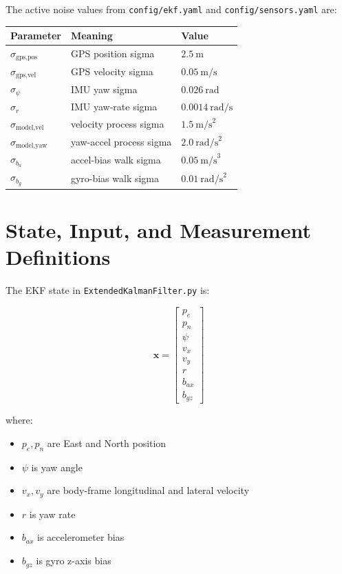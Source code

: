 \documentclass[11pt]{article}
\newcommand{\vect}[1]{\boldsymbol{#1}}
\begin{document}
The active noise values from \texttt{config/ekf.yaml} and \texttt{config/sensors.yaml} are:

\begin{center}
\begin{tabular}{lll}
\toprule
Parameter & Meaning & Value \\
\midrule
$\sigma_{\text{gps,pos}}$ & GPS position sigma & $2.5~\text{m}$ \\
$\sigma_{\text{gps,vel}}$ & GPS velocity sigma & $0.05~\text{m/s}$ \\
$\sigma_{\psi}$ & IMU yaw sigma & $0.026~\text{rad}$ \\
$\sigma_r$ & IMU yaw-rate sigma & $0.0014~\text{rad/s}$ \\
$\sigma_{\text{model,vel}}$ & velocity process sigma & $1.5~\text{m/s}^2$ \\
$\sigma_{\text{model,yaw}}$ & yaw-accel process sigma & $2.0~\text{rad/s}^2$ \\
$\sigma_{b_a}$ & accel-bias walk sigma & $0.05~\text{m/s}^3$ \\
$\sigma_{b_g}$ & gyro-bias walk sigma & $0.01~\text{rad/s}^2$ \\
\bottomrule
\end{tabular}
\end{center}

\section{State, Input, and Measurement Definitions}

The EKF state in \texttt{ExtendedKalmanFilter.py} is:

\begin{equation}
\vect{x} =
\begin{bmatrix}
p_e \\ p_n \\ \psi \\ v_x \\ v_y \\ r \\ b_{ax} \\ b_{gz}
\end{bmatrix}
\end{equation}

where:

\begin{itemize}
    \item $p_e, p_n$ are East and North position
    \item $\psi$ is yaw angle
    \item $v_x, v_y$ are body-frame longitudinal and lateral velocity
    \item $r$ is yaw rate
    \item $b_{ax}$ is accelerometer bias
    \item $b_{gz}$ is gyro z-axis bias
\end{itemize}
\end{document}
